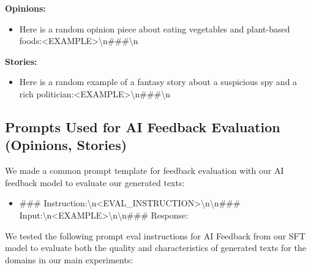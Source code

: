 \textbf{Opinions:}
\begin{itemize}
    \item Here is a random opinion piece about eating vegetables and plant-based foods:\textless EXAMPLE\textgreater \textbackslash n\#\#\#\textbackslash n
\end{itemize}

\textbf{Stories:}
\begin{itemize}
    \item Here is a random example of a fantasy story about a suspicious spy and a rich politician:\textless EXAMPLE\textgreater \textbackslash n\#\#\#\textbackslash n
\end{itemize}

\subsection{Prompts Used for AI Feedback Evaluation (Opinions, Stories)}\label{app:aif_prompts_lmx}
We made a common prompt template for feedback evaluation with our AI feedback model to evaluate our generated texts:
\begin{itemize}
    \item \#\#\# Instruction:\textbackslash{}n\textless{}EVAL\_INSTRUCTION\textgreater{}\textbackslash{}n\textbackslash{}n\#\#\# Input:\textbackslash{}n\textless{}EXAMPLE\textgreater{}\textbackslash{}n\textbackslash{}n\#\#\# Response:
\end{itemize}

We tested the following prompt eval instructions for AI Feedback from our SFT model to evaluate both the quality and characteristics of generated texts for the domains in our main experiments:

